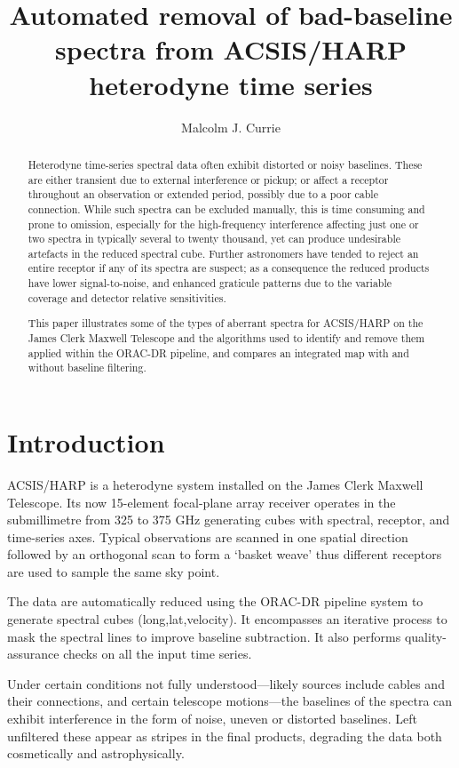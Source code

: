 \documentclass[11pt,twoside]{article}
\begin{document}
\title{Automated removal of bad-baseline spectra from ACSIS/HARP
heterodyne time series}
\author{Malcolm J. Currie}

\begin{abstract}
Heterodyne time-series spectral data often exhibit distorted or noisy 
baselines. These are either transient due to external interference or 
pickup; or affect a receptor throughout an observation or extended 
period, possibly due to a poor cable connection. While such spectra can 
be excluded manually, this is time consuming and prone to omission, 
especially for the high-frequency interference affecting just one or two 
spectra in typically several to twenty thousand, yet can produce undesirable 
artefacts in the reduced spectral cube. Further astronomers have tended 
to reject an entire receptor if any of its spectra are suspect; as a 
consequence the reduced products have lower signal-to-noise, and 
enhanced graticule patterns due to the variable coverage and detector 
relative sensitivities.

This paper illustrates some of the types of aberrant spectra for
ACSIS/HARP on the James Clerk Maxwell Telescope and the algorithms
used to identify and remove them applied within the ORAC-DR pipeline,
and compares an integrated map with and without baseline filtering. 
\end{abstract}

\section{Introduction}

ACSIS/HARP \citep{buckle_2009} is a heterodyne system installed on
the James Clerk Maxwell Telescope. Its now 15-element focal-plane
array receiver operates in the submillimetre from 325 to 375 GHz
generating cubes with spectral, receptor, and time-series axes.
Typical observations are scanned in one spatial direction followed by
an orthogonal scan to form a `basket weave' thus different receptors
are used to sample the same sky point.

The data are automatically reduced using the ORAC-DR pipeline system
\citep{cavanagh_2008,jenness_2008} to generate spectral cubes
(long,lat,velocity). It encompasses an iterative process to mask the
spectral lines to improve baseline subtraction.  It also performs
quality-assurance checks on all the input time series.

Under certain conditions not fully understood---likely sources include 
cables and their connections, and certain telescope motions---the 
baselines of the spectra can exhibit interference in the form of noise, 
uneven or distorted baselines.  Left unfiltered these appear as stripes 
in the final products, degrading the data both cosmetically and 
astrophysically.
\end{document}
